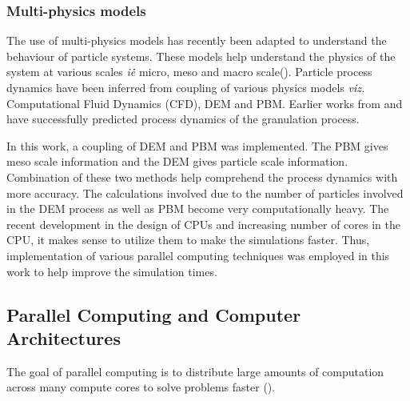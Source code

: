 \documentclass[preprint,11pt,authoryear]{elsarticle}
\begin{document}
	    
	
	    \subsubsection{Multi-physics models}
		\par The use of multi-physics models has recently been adapted to understand the behaviour of particle systems. These models help understand the physics of the system at various scales \textit{i\.e\.} micro, meso and macro scale(\cite{sen2014}). Particle process dynamics have been inferred from coupling of various physics models \textit{viz.} Computational Fluid Dynamics (CFD), DEM and PBM. Earlier works from \cite{sen2014} and \cite{Barrasso2015cerd} have successfully predicted process dynamics of the granulation process.
		\par In this work, a coupling of DEM and PBM was implemented. The PBM gives meso scale information and the DEM gives particle scale information. Combination of these two methods help comprehend the process dynamics with more accuracy. The calculations involved due to the number of particles involved in the DEM process as well as PBM become very computationally heavy. The recent development in the design of CPUs and increasing number of cores in the CPU, it makes sense to utilize them to make the simulations faster. Thus, implementation of various parallel computing techniques was employed in this work to help improve the simulation times.  
	
	
	  \subsection{Parallel Computing and Computer Architectures}
	    \par The goal of parallel computing is to distribute large amounts of computation across many compute cores to solve problems faster (\cite{wilkinson2005}).
\end{document}
